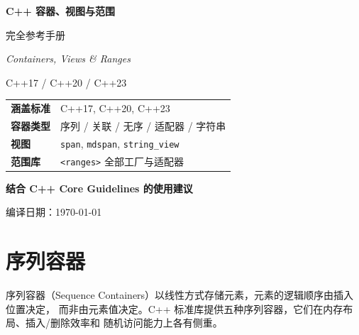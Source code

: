 \documentclass[12pt,a4paper,fontset=fandol]{ctexbook}
\newcommand{\cpp}[1]{C++#1}
\begin{document}
\begin{titlepage}
\centering
\vspace*{4cm}
{\Huge\bfseries C++ 容器、视图与范围\par}
\vspace{1cm}
{\LARGE 完全参考手册\par}
\vspace{1.5cm}
{\Large\itshape Containers, Views \& Ranges\par}
\vspace{0.5cm}
{\large \cpp{17} / \cpp{20} / \cpp{23}\par}
\vspace{3cm}

{\large
\begin{tabular}{ll}
\toprule
\textbf{涵盖标准} & \cpp{17}, \cpp{20}, \cpp{23} \\
\textbf{容器类型}   & 序列 / 关联 / 无序 / 适配器 / 字符串 \\
\textbf{视图}      & \texttt{span}, \texttt{mdspan}, \texttt{string\_view} \\
\textbf{范围库}    & \texttt{<ranges>} 全部工厂与适配器 \\
\bottomrule
\end{tabular}
}

\vfill
{\large\bfseries 结合 C++ Core Guidelines 的使用建议\par}
\vspace{0.5cm}
{\normalsize 编译日期：\today\par}
\end{titlepage}

\frontmatter
\tableofcontents

\mainmatter

\part{序列容器}

序列容器（Sequence Containers）以线性方式存储元素，元素的逻辑顺序由插入位置决定，
而非由元素值决定。C++ 标准库提供五种序列容器，它们在内存布局、插入/删除效率和
随机访问能力上各有侧重。
\end{document}
